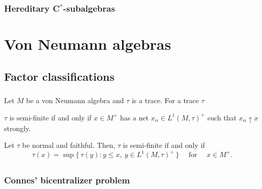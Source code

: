 \documentclass{../note}
\begin{document}
\begin{prb}
\end{prb}



\section{Hereditary C$^*$-subalgebras}
\begin{prb}

\end{prb}










\part{Von Neumann algebras}

\chapter{Factor classifications}

\section{}
\begin{prb}
Let $M$ be a von Neumann algebra and $\tau$ is a trace.
For a trace $\tau$
\begin{parts}
\item $\tau$ is semi-finite if and only if $x\in M^+$ has a net $x_\alpha\in L^1(M,\tau)^+$ such that $x_\alpha\uparrow x$ strongly.
\item Let $\tau$ be normal and faithful. Then, $\tau$ is semi-finite if and only if
\[\tau(x)=\sup\{\,\tau(y):y\le x,\ y\in L^1(M,\tau)^+\,\}\quad\text{ for }\quad x\in M^+.\]
\end{parts}
\end{prb}

\section{}



\chapter{}
\section{Connes' bicentralizer problem}
\end{document}
